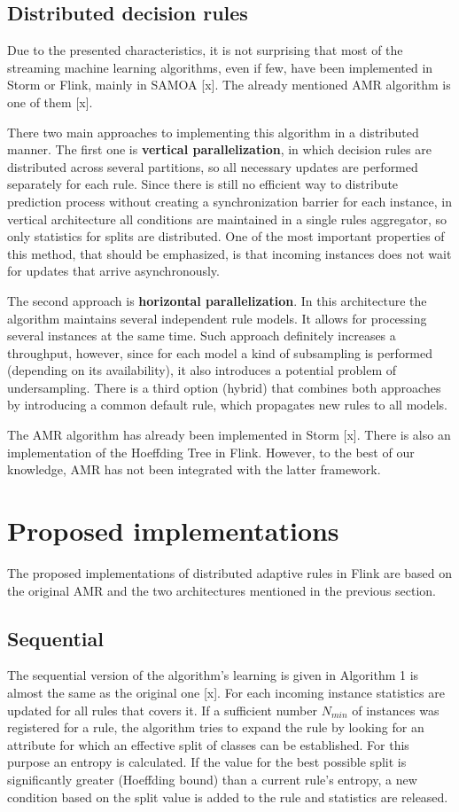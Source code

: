 \documentclass[journal]{IEEEtran}
\begin{document}
\subsection{Distributed decision rules}
Due to the presented characteristics, it is not surprising that most of the streaming machine learning algorithms, even if few, have been implemented in Storm or Flink, mainly in SAMOA [x]. The already mentioned AMR algorithm is one of them [x]. 

There two main approaches to implementing this algorithm in a distributed manner. The first one is \textbf{vertical parallelization}, in which decision rules are distributed across several partitions, so all necessary updates are performed separately for each rule. Since there is still no efficient way to distribute prediction process without creating a synchronization barrier for each instance, in vertical architecture all conditions are maintained in a single rules aggregator, so only statistics for splits are distributed. One of the most important properties of this method, that should be emphasized, is that incoming instances does not wait for updates that arrive asynchronously.

The second approach is \textbf{horizontal parallelization}. In this architecture the algorithm maintains several independent rule models. It allows for processing several instances at the same time. Such approach definitely increases a throughput, however, since for each model a kind of subsampling is performed (depending on its availability), it also introduces a potential problem of undersampling. There is a third option (hybrid) that combines both approaches by introducing a common default rule, which propagates new rules to all models.

The AMR algorithm has already been implemented in Storm [x]. There is also an implementation of the Hoeffding Tree in Flink. However, to the best of our knowledge, AMR has not been integrated with the latter framework.

\section{Proposed implementations}

The proposed implementations of distributed adaptive rules in Flink are based on the original AMR and the two architectures mentioned in the previous section.

\subsection{Sequential}
The sequential version of the algorithm's learning is given in Algorithm 1 is almost the same as the original one [x]. For each incoming instance statistics are updated for all rules that covers it. If a sufficient number $N_{min}$ of instances was registered for a rule, the algorithm tries to expand the rule by looking for an attribute for which an effective split of classes can be established. For this purpose an entropy is calculated. If the value for the best possible split is significantly greater (Hoeffding bound) than a current rule's entropy, a new condition based on the split value is added to the rule and statistics are released.
\end{document}

